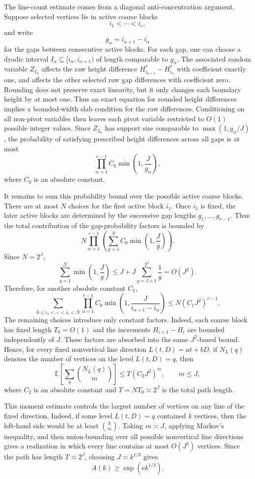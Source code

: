 \documentclass[10pt,a4paper]{amsart}
\newcommand{\E}{\mathbb E}
\newcommand{\1}{\mathbf 1}
\begin{document}
\bigskip
\noindent
The line-count estimate comes from a diagonal anti-concentration argument. Suppose selected vertices lie in active coarse blocks
\[
i_1<\cdots<i_r,
\]
and write
\[
g_\alpha=i_{\alpha+1}-i_\alpha
\]
for the gaps between consecutive active blocks. For each gap, one can choose a dyadic interval $I_\alpha\subseteq[i_\alpha,i_{\alpha+1})$ of length comparable to $g_\alpha$. The associated random variable $Z_{I_\alpha}$ affects the raw height difference $H_{i_{\alpha+1}}^*-H_{i_\alpha}^*$ with coefficient exactly one, and affects the other selected raw gap differences with coefficient zero. Rounding does not preserve exact linearity, but it only changes each boundary height by at most one. Thus an exact equation for rounded height differences implies a bounded-width slab condition for the raw differences. Conditioning on all non-pivot variables then leaves each pivot variable restricted to $O(1)$ possible integer values. Since $Z_{I_\alpha}$ has support size comparable to $\max(1,g_\alpha/J)$, the probability of satisfying prescribed height differences across all gaps is at most
\[
\prod_{\alpha=1}^{r-1}
C_0\min\left(1,\frac{J}{g_\alpha}\right),
\]
where $C_0$ is an absolute constant.

\bigskip
\noindent
It remains to sum this probability bound over the possible active coarse blocks. There are at most $N$ choices for the first active block $i_1$. Once $i_1$ is fixed, the later active blocks are determined by the successive gap lengths $g_1,\ldots,g_{r-1}$. Thus the total contribution of the gap-probability factors is bounded by
\[
N\prod_{\alpha=1}^{r-1}
\left(
\sum_{g=1}^{N} C_0\min\left(1,\frac{J}{g}\right)
\right).
\]
Since $N=2^J$,
\[
\sum_{g=1}^{N}\min\left(1,\frac{J}{g}\right)
\le
J+J\sum_{g=J+1}^{2^J}\frac1g
=O(J^2).
\]
Therefore, for another absolute constant $C_1$,
\[
\sum_{0\le i_1<\cdots<i_r<N}
\prod_{\alpha=1}^{r-1}
C_0\min\left(1,\frac{J}{i_{\alpha+1}-i_\alpha}\right)
\le
N(C_1J^2)^{r-1}.
\]
The remaining choices introduce only constant factors. Indeed, each coarse block has fixed length $T_0=O(1)$ and the increments $H_{i+1}-H_i$ are bounded independently of $J$. These factors are absorbed into the same $J^2$-based bound. Hence, for every fixed nonvertical line direction $L(t,D)=at+bD$, if $N_L(q)$ denotes the number of vertices on the level $L(t,D)=q$, then
\[
\E\left[\sum_q\binom{N_L(q)}{m}\right]
\le
T(C_2J^2)^m,\qquad m\le J,
\]
where $C_2$ is an absolute constant and $T=NT_0\asymp 2^J$ is the total path length.

\bigskip
\noindent
This moment estimate controls the largest number of vertices on any line of the fixed direction. Indeed, if some level $L(t,D)=q$ contained $k$ vertices, then the left-hand side would be at least $\binom{k}{m}$. Taking $m\asymp J$, applying Markov's inequality, and then union-bounding over all possible nonvertical line directions gives a realization in which every line contains at most $O(J^3)$ vertices. Since the path has length $T\asymp 2^J$, choosing $J\asymp k^{1/3}$ gives
\[
A(k)\ge \exp(c k^{1/3}).
\]
\end{document}
